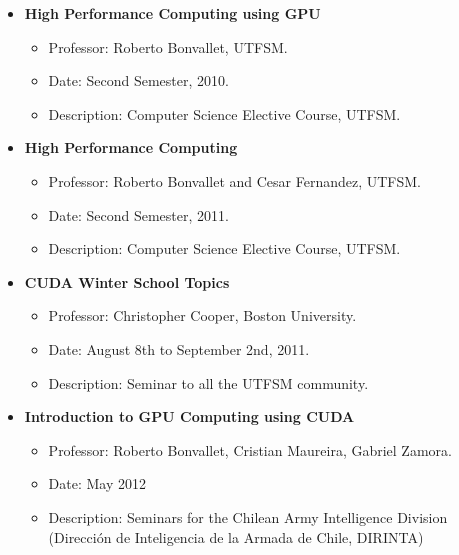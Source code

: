 \begin{itemize}

    \item \textbf{High Performance Computing using GPU}
        \begin{itemize}
            \item Professor: Roberto Bonvallet, UTFSM.
            \item Date: Second Semester, 2010.
            \item Description: Computer Science Elective Course, UTFSM.
        \end{itemize}

    \item \textbf{High Performance Computing}
        \begin{itemize}
            \item Professor: Roberto Bonvallet and Cesar Fernandez, UTFSM.
            \item Date: Second Semester, 2011.
            \item Description: Computer Science Elective Course, UTFSM.
        \end{itemize}

    \item \textbf{CUDA Winter School Topics}
        \begin{itemize}
            \item Professor: Christopher Cooper, Boston University.
            \item Date: August 8th to September 2nd, 2011.
            \item Description: Seminar to all the UTFSM community.
        \end{itemize}

    \item \textbf{Introduction to GPU Computing using CUDA}
        \begin{itemize}
            \item Professor: Roberto Bonvallet, Cristian Maureira, Gabriel Zamora.
            \item Date: May 2012
            \item Description: Seminars for the Chilean Army Intelligence Division
                (Dirección de Inteligencia de la Armada de Chile, DIRINTA)
        \end{itemize}

\end{itemize}



